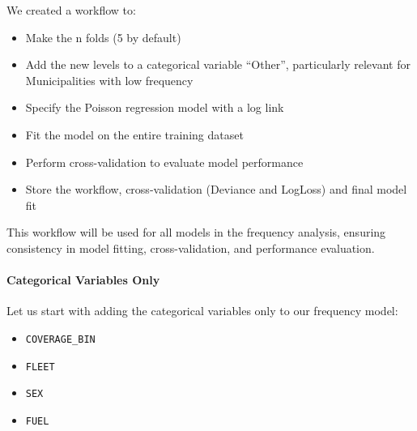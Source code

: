\documentclass[
  english,
  11pt,
]{article}
\newenvironment{Shaded}{\begin{snugshade}}{\end{snugshade}}
\newcommand{\AttributeTok}[1]{\textcolor[rgb]{0.13,0.29,0.53}{#1}}
\newcommand{\FunctionTok}[1]{\textcolor[rgb]{0.13,0.29,0.53}{\textbf{#1}}}
\newcommand{\NormalTok}[1]{#1}
\newcommand{\SpecialCharTok}[1]{\textcolor[rgb]{0.81,0.36,0.00}{\textbf{#1}}}
\providecommand{\tightlist}{%
  \setlength{\itemsep}{0pt}\setlength{\parskip}{0pt}}
\begin{document}
\begin{Shaded}
\end{Shaded}

We created a workflow to:

\begin{itemize}
\tightlist
\item
  Make the n folds (5 by default)
\item
  Add the new levels to a categorical variable ``Other'', particularly
  relevant for Municipalities with low frequency
\item
  Specify the Poisson regression model with a log link
\item
  Fit the model on the entire training dataset
\item
  Perform cross-validation to evaluate model performance
\item
  Store the workflow, cross-validation (Deviance and LogLoss) and final
  model fit
\end{itemize}

This workflow will be used for all models in the frequency analysis,
ensuring consistency in model fitting, cross-validation, and performance
evaluation.

\paragraph{Categorical Variables Only}\label{categorical-variables-only}

Let us start with adding the categorical variables only to our frequency
model:

\begin{itemize}
\tightlist
\item
  \texttt{COVERAGE\_BIN}
\item
  \texttt{FLEET}
\item
  \texttt{SEX}
\item
  \texttt{FUEL}
\end{itemize}
\end{document}
